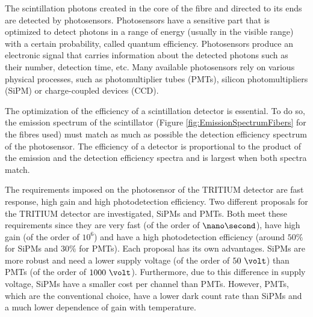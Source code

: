 The scintillation photons created in the core of the fibre and directed to its ends are detected by photosensors. Photosensors have a sensitive part that is optimized to detect photons in a range of energy (usually in the visible range) with a certain probability, called quantum efficiency. Photosensors produce an electronic signal that carries information about the detected photons such as their number, detection time, etc. Many available photosensors rely on various physical processes, such as photomultiplier tubes (PMTs), silicon photomultipliers (SiPM) or charge-coupled devices (CCD). %

The optimization of the efficiency of a scintillation detector is essential. To do so, the emission spectrum of the scintillator (Figure \ref{fig:EmissionSpectrumFibers} for the fibres used) must match as much as possible the detection efficiency spectrum of the photosensor. The efficiency of a detector is proportional to the product of the emission and the detection efficiency spectra and is largest when both spectra match.

The requirements imposed on the photosensor of the TRITIUM detector are fast response, high gain and high photodetection efficiency. Two different proposals for the TRITIUM detector are investigated, SiPMs and PMTs. Both meet these requirements since they are very fast (of the order of $\nano\second$), have high gain (of the order of $10^{6}$) and have a high photodetection efficiency (around $50\%$ for SiPMs and $30\%$ for PMTs). Each proposal has its own advantages. SiPMs are more robust and need a lower supply voltage (of the order of $50~\volt$) than PMTs (of the order of $1000~\volt$). Furthermore, due to this difference in supply voltage, SiPMs have a smaller cost per channel than PMTs. However, PMTs, which are the conventional choice, have a lower dark count rate than SiPMs and a much lower dependence of gain with temperature.


